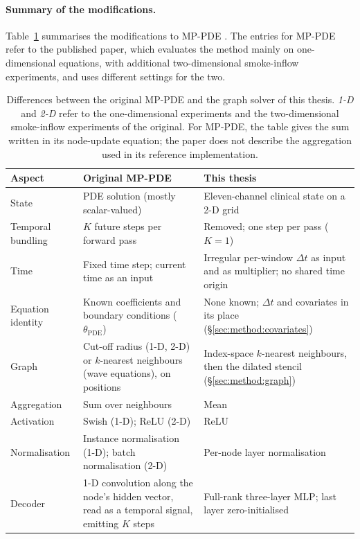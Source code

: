 \paragraph{Summary of the modifications.}
Table~\ref{tab:method:mppde-diff} summarises the modifications to MP-PDE
\citep{Brandstetter2022}. The entries for MP-PDE refer to the published
paper, which evaluates the method mainly on one-dimensional equations,
with additional two-dimensional smoke-inflow experiments, and uses
different settings for the two.

\begin{table}[t]
  \centering
  \caption[Differences between the original MP-PDE and the graph solver of
  this thesis.]{%
    Differences between the original MP-PDE \citep{Brandstetter2022} and
    the graph solver of this thesis. \emph{1-D} and \emph{2-D} refer to the
    one-dimensional experiments and the two-dimensional smoke-inflow
    experiments of the original. For MP-PDE, the table gives the sum
    written in its node-update equation; the paper does not describe the
    aggregation used in its reference implementation.}
  \label{tab:method:mppde-diff}
  \small
  \begin{tabular}{p{} p{} p{}}
    \toprule
    Aspect & Original MP-PDE & This thesis \\
    \midrule
    State & PDE solution (mostly scalar-valued) & Eleven-channel clinical state on a
      2-D grid \\
    Temporal bundling & $K$ future steps per forward pass & Removed;
      one step per pass ($K = 1$) \\
    Time & Fixed time step; current time as an input & Irregular
      per-window $\Delta t$ as input and as multiplier; no shared time
      origin \\
    Equation identity & Known coefficients and boundary conditions
      ($\theta_{\text{PDE}}$) & None known; $\Delta t$ and covariates in
      its place (\S\ref{sec:method:covariates}) \\
    Graph & Cut-off radius (1-D, 2-D) or $k$-nearest neighbours (wave
      equations), on positions & Index-space $k$-nearest neighbours, then
      the dilated stencil (\S\ref{sec:method:graph}) \\
    Aggregation & Sum over neighbours & Mean \\
    Activation & Swish (1-D); ReLU (2-D) & ReLU \\
    Normalisation & Instance normalisation (1-D); batch normalisation
      (2-D) & Per-node layer normalisation \\
    Decoder & 1-D convolution along the node's hidden vector, read as a
      temporal signal, emitting $K$ steps & Full-rank three-layer MLP;
      last layer zero-initialised \\
    \bottomrule
  \end{tabular}
\end{table}

